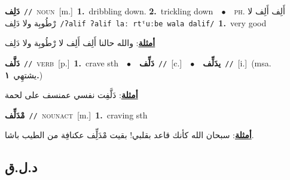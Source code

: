 \documentclass[10pt,a4paper,twoside]{article} %
\begin{document}
\begin{multicols}{2}
{\setlength\topsep{0pt}\textbf{\foreignlanguage{arabic}{دَلِف}}\ {\color{gray}\texttt{//}\color{black}}\ \textsc{noun}\ [m.]\ \textbf{1.}~dribbling down.  \textbf{2.}~trickling down\ \ $\bullet$\ \ \textsc{ph.} \color{gray} \foreignlanguage{arabic}{أَلِف أَلِف لا رْطُوبِة ولا دَلِف}\color{black}\ {\color{gray}\texttt{/{\sffamily ʔalif ʔalif laː rtˤuːbe wala dalif}/}\color{black}}\ \textbf{1.}~very good\  \begin{flushright}\color{gray}\foreignlanguage{arabic}{\textbf{\underline{\foreignlanguage{arabic}{أمثلة}}}: والله حالنا أَلِف أَلِف لا رْطُوبِة ولا دَلِف}\end{flushright}\color{black}} \vspace{2mm}

{\setlength\topsep{0pt}\textbf{\foreignlanguage{arabic}{دَلَّف}}\ {\color{gray}\texttt{//}\color{black}}\ \textsc{verb}\ [p.]\ \textbf{1.}~crave sth\ \ $\bullet$\ \ \setlength\topsep{0pt}\textbf{\foreignlanguage{arabic}{دَلِّف}}\ {\color{gray}\texttt{//}\color{black}}\ [c.]\ \ $\bullet$\ \ \setlength\topsep{0pt}\textbf{\foreignlanguage{arabic}{يدَلِّف}}\ {\color{gray}\texttt{//}\color{black}}\ [i.]\ \color{gray}(msa. \foreignlanguage{arabic}{يشتهِي}~\foreignlanguage{arabic}{\textbf{١.}})\color{black}\  \begin{flushright}\color{gray}\foreignlanguage{arabic}{\textbf{\underline{\foreignlanguage{arabic}{أمثلة}}}: دَلَّفِت نفسي عمنسف على لحمة}\end{flushright}\color{black}} \vspace{2mm}

{\setlength\topsep{0pt}\textbf{\foreignlanguage{arabic}{مْدَلِّف}}\ {\color{gray}\texttt{//}\color{black}}\ \textsc{noun\textunderscore act}\ [m.]\ \textbf{1.}~craving sth\  \begin{flushright}\color{gray}\foreignlanguage{arabic}{\textbf{\underline{\foreignlanguage{arabic}{أمثلة}}}: سبحان الله كأنك قاعد بقلبي! بقيت مْدَلِِّف عكنافِة من الطيب باشا.}\end{flushright}\color{black}} \vspace{2mm}

\vspace{-3mm}
\subsection*{\color{blue}\foreignlanguage{arabic}{د.ل.ق}\color{blue}{}} 


\end{multicols}
\end{document}
